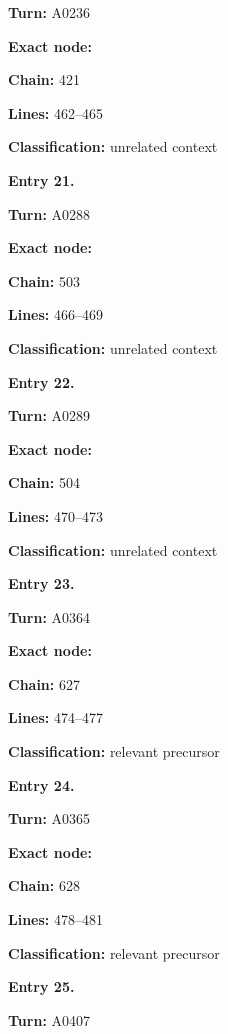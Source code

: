 \documentclass[10pt,a4paper,oneside]{report}
\begin{document}
\textbf{Turn:} A0236

\textbf{Exact node:} \protect{}

\textbf{Chain:} 421

\textbf{Lines:} 462--465

\textbf{Classification:} unrelated context


\textbf{Entry 21.}

\textbf{Turn:} A0288

\textbf{Exact node:} \protect{}

\textbf{Chain:} 503

\textbf{Lines:} 466--469

\textbf{Classification:} unrelated context


\textbf{Entry 22.}

\textbf{Turn:} A0289

\textbf{Exact node:} \protect{}

\textbf{Chain:} 504

\textbf{Lines:} 470--473

\textbf{Classification:} unrelated context


\textbf{Entry 23.}

\textbf{Turn:} A0364

\textbf{Exact node:} \protect{}

\textbf{Chain:} 627

\textbf{Lines:} 474--477

\textbf{Classification:} relevant precursor


\textbf{Entry 24.}

\textbf{Turn:} A0365

\textbf{Exact node:} \protect{}

\textbf{Chain:} 628

\textbf{Lines:} 478--481

\textbf{Classification:} relevant precursor


\textbf{Entry 25.}

\textbf{Turn:} A0407
\end{document}
